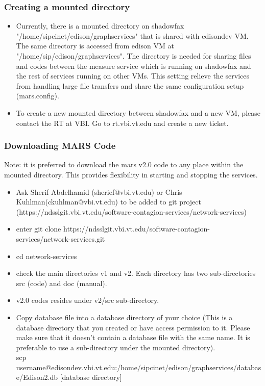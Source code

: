 \subsubsection{Creating a mounted directory}
\begin{itemize}
\item Currently, there is a mounted directory on shadowfax "/home/sipcinet/edison/graphservices" that is shared with edisondev VM. The same directory is accessed from edison VM at "/home/sip/edison/graphservices". The directory is needed for sharing files and codes between the measure service which is running on shadowfax and the rest of services running on other VMs. This setting relieve the services from handling large file transfers and share the same configuration setup (mars.config).
\item To create a new mounted directory between shadowfax and a new VM, please contact the RT at VBI. Go to rt.vbi.vt.edu and create a new ticket.
\end{itemize}

\subsubsection{Downloading MARS Code}
Note: it is preferred to download the mars v2.0 code to any place within the mounted directory. This provides flexibility in starting and stopping the services.
\begin{itemize}
\item Ask Sherif Abdelhamid (sherief@vbi.vt.edu) or Chris Kuhlman(ckuhlman@vbi.vt.edu) to be added to git project (https://ndsslgit.vbi.vt.edu/software-contagion-services/network-services)
\item enter git clone https://ndsslgit.vbi.vt.edu/software-contagion-services/network-services.git
\item cd network-services
\item check the main directories v1 and v2. Each directory has two sub-directories src (code) and doc (manual).
\item v2.0 codes resides under v2/src sub-directory.
\item Copy database file into a database directory of your choice (This is a database directory that you created or have access permission to it. Please make sure that it doesn't contain a database file with the same name. It is preferable to use a sub-directory under the mounted directory). \\
scp username@edisondev.vbi.vt.edu:/home/sipcinet/edison/graphservices/database/Edison2.db [database directory]
\end{itemize}

